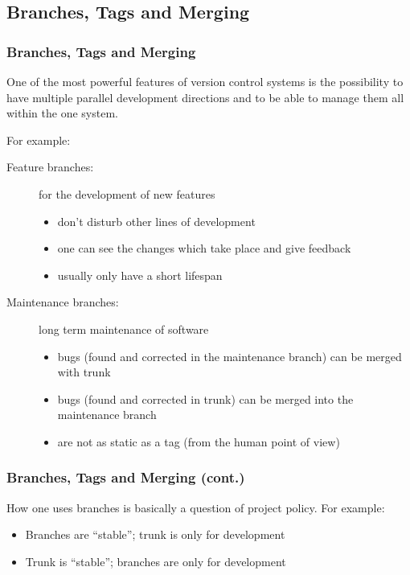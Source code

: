 \subsection{Branches, Tags and Merging}
\begin{frame}[fragile,label=branch-merge]
    \frametitle{Branches, Tags and Merging}

    One of the most powerful features of version control systems is the
    possibility to have multiple parallel development directions and to be
    able to manage them all within the one system.

    For example:
    \begin{description}
        \item[Feature branches:] for the development of new features
            \begin{itemize}
                \item don't disturb other lines of development
                \item one can see the changes which take place and give
                    feedback
                \item usually only have a short lifespan
            \end{itemize}
        \item[Maintenance branches:] long term maintenance of software
        \begin{itemize}
            \item bugs (found and corrected in the maintenance branch)
                can be merged with trunk
            \item bugs (found and corrected in trunk) can be merged into
                the maintenance branch
            \item are not as static as a tag (from the human point of view)
        \end{itemize}
    \end{description}
\end{frame}

\begin{frame}[fragile]
    \frametitle{Branches, Tags and Merging (cont.)}
    How one uses branches is basically a question of project policy.  For
    example:
    \begin{itemize}
        \item Branches are \enquote{stable}; trunk is only for development
        \item Trunk is \enquote{stable}; branches are only for development
    \end{itemize}

\begin{center}
    \resizebox{\textwidth}{!}{
        
    }
\end{center}

\end{frame}

